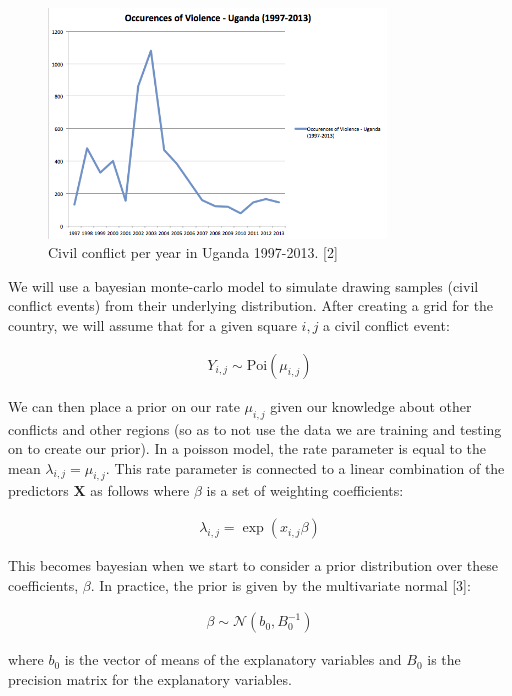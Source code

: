 \documentclass{article} %
\begin{document}
\begin{figure}
  \centering
  \includegraphics[width=0.8\textwidth]{figures/PerYear.png}
  \caption{Civil conflict per year in Uganda 1997-2013. [2]}
  \label{fig:shells}
\end{figure}

We will use a bayesian monte-carlo model to simulate drawing samples (civil conflict events) from their underlying distribution. After creating a grid for the country, we will assume that for a given square $i,j$ a civil conflict event:

\begin{align}
Y_{i,j} \sim \text{Poi}(\mu_{i,j})
\end{align}

We can then place a prior on our rate $\mu_{i,j}$ given our knowledge about other conflicts and other regions (so as to not use the data we are training and testing on to create our prior). In a poisson model, the rate parameter is equal to the mean $\lambda_{i,j} = \mu_{i,j}$. This rate parameter is connected to a linear combination of the predictors $\mathbf{X}$ as follows where $\beta$ is a set of weighting coefficients:

\begin{align}
\lambda_{i,j}  = \exp(x_{i,j} \beta)
\end{align}

This becomes bayesian when we start to consider a prior distribution over these coefficients, $\beta$. In practice, the prior is given by the multivariate normal [3]:

\begin{align}
\beta  \sim \mathcal{N}(b_0, B^{-1}_0)
\end{align}

where $b_0$ is the vector of means of the explanatory variables and $B_0$ is the precision matrix for the explanatory variables.
\end{document}
